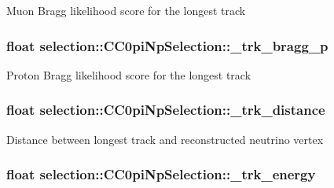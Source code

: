 Muon Bragg likelihood score for the longest track \hypertarget{classselection_1_1CC0piNpSelection_a52d578481ee7dd4fed45f8e3c8ed44da}{
\subsubsection[{\-\_\-trk\-\_\-bragg\-\_\-p}]{\setlength{\rightskip}{0pt plus 5cm}float selection\-::\-C\-C0pi\-Np\-Selection\-::\-\_\-trk\-\_\-bragg\-\_\-p\hspace{0.3cm}{\ttfamily [private]}}}\label{classselection_1_1CC0piNpSelection_a52d578481ee7dd4fed45f8e3c8ed44da}
Proton Bragg likelihood score for the longest track \hypertarget{classselection_1_1CC0piNpSelection_a0f16777192fbed04bcc67edfdfa67e6b}{
\subsubsection[{\-\_\-trk\-\_\-distance}]{\setlength{\rightskip}{0pt plus 5cm}float selection\-::\-C\-C0pi\-Np\-Selection\-::\-\_\-trk\-\_\-distance\hspace{0.3cm}{\ttfamily [private]}}}\label{classselection_1_1CC0piNpSelection_a0f16777192fbed04bcc67edfdfa67e6b}
Distance between longest track and reconstructed neutrino vertex \hypertarget{classselection_1_1CC0piNpSelection_a98e03f33f34b5df397a1d1144b1de4a1}{
\subsubsection[{\-\_\-trk\-\_\-energy}]{\setlength{\rightskip}{0pt plus 5cm}float selection\-::\-C\-C0pi\-Np\-Selection\-::\-\_\-trk\-\_\-energy\hspace{0.3cm}{\ttfamily [private]}}}\label{classselection_1_1CC0piNpSelection_a98e03f33f34b5df397a1d1144b1de4a1}
